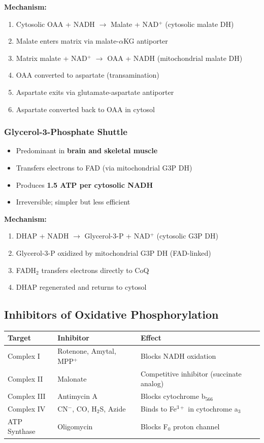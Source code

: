 \textbf{Mechanism:}
\begin{enumerate}
    \item Cytosolic OAA + NADH $\rightarrow$ Malate + NAD$^+$ (cytosolic malate DH)
    \item Malate enters matrix via malate-$\alpha$KG antiporter
    \item Matrix malate + NAD$^+$ $\rightarrow$ OAA + NADH (mitochondrial malate DH)
    \item OAA converted to aspartate (transamination)
    \item Aspartate exits via glutamate-aspartate antiporter
    \item Aspartate converted back to OAA in cytosol
\end{enumerate}

\subsubsection{Glycerol-3-Phosphate Shuttle}

\begin{itemize}
    \item Predominant in \textbf{brain and skeletal muscle}
    \item Transfers electrons to FAD (via mitochondrial G3P DH)
    \item Produces \textbf{1.5 ATP per cytosolic NADH}
    \item Irreversible; simpler but less efficient
\end{itemize}

\textbf{Mechanism:}
\begin{enumerate}
    \item DHAP + NADH $\rightarrow$ Glycerol-3-P + NAD$^+$ (cytosolic G3P DH)
    \item Glycerol-3-P oxidized by mitochondrial G3P DH (FAD-linked)
    \item FADH$_2$ transfers electrons directly to CoQ
    \item DHAP regenerated and returns to cytosol
\end{enumerate}

\subsection{Inhibitors of Oxidative Phosphorylation}

\begin{center}
\begin{tabular}{llp{6cm}}
\toprule
\textbf{Target} & \textbf{Inhibitor} & \textbf{Effect} \\
\midrule
Complex I & Rotenone, Amytal, MPP$^+$ & Blocks NADH oxidation \\
Complex II & Malonate & Competitive inhibitor (succinate analog) \\
Complex III & Antimycin A & Blocks cytochrome b$_{566}$ \\
Complex IV & CN$^-$, CO, H$_2$S, Azide & Binds to Fe$^{3+}$ in cytochrome a$_3$ \\
ATP Synthase & Oligomycin & Blocks F$_0$ proton channel \\
\bottomrule
\end{tabular}
\end{center}

